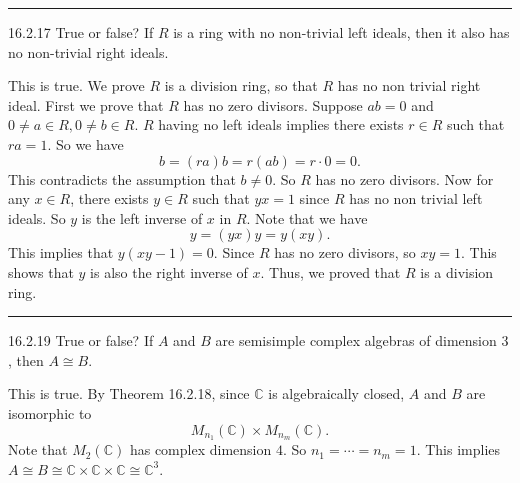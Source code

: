 \documentclass[a4paper, 12pt]{article}
\begin{document}
\noindent\rule{7in}{2.8pt}
\begin{problem}{16.2.17}
True or false? If \(R\) is a ring with no non-trivial left ideals, then it also has no non-trivial right ideals.
\end{problem}
\begin{solution}
This is true. We prove \(R\) is a division ring, so that \(R\) has no non trivial right ideal. First we prove that \(R\) has no zero divisors. Suppose 
\(ab=0\) and \(0\neq a\in R, 0\neq b\in R\). \(R\) having no left ideals implies there exists \(r\in R\) such that \(ra=1\). So we have 
\[b=(ra)b=r(ab)=r\cdot 0=0.\]
This contradicts the assumption that \(b\neq 0\). So \(R\) has no zero divisors. Now for any \(x\in R\), there exists \(y\in R\) such that \(yx=1\) since \(R\) has no non trivial left 
ideals. So \(y\) is the left inverse of \(x\) in \(R\). Note that we have
\[y=(yx)y=y(xy).\]
This implies that \(y(xy-1)=0\). Since \(R\) has no zero divisors, so \(xy=1\). This shows that \(y\) is also the right inverse of \(x\). Thus, we proved that \(R\) is a division ring.  
\end{solution}

\noindent\rule{7in}{2.8pt}
\begin{problem}{16.2.19}
True or false? If \(A\) and \(B\) are semisimple complex algebras of dimension \(3\), then \(A\cong B\).
\end{problem}
\begin{solution}
This is true. By Theorem 16.2.18, since \(\mathbb{C}\) is algebraically closed, \(A\) and \(B\) are isomorphic to 
\[M_{n_1}(\mathbb{C})\times M_{n_m}(\mathbb{C}).\]
Note that \(M_2(\mathbb{C})\) has complex dimension \(4\). So \(n_1=\cdots=n_m=1\). This implies \(A\cong B\cong \mathbb{C}\times \mathbb{C}\times \mathbb{C}\cong \mathbb{C}^3\).
\end{solution}
\end{document}
